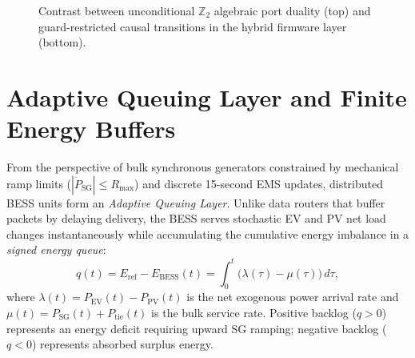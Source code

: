 \documentclass[journal]{IEEEtran}
\begin{document}
\begin{figure}[t]
\centering
{}
\caption{Contrast between unconditional $\mathbb{Z}_2$ algebraic port duality (top) and guard-restricted causal transitions in the hybrid firmware layer (bottom).}
\label{fig:group_causality}
\end{figure}

\section{Adaptive Queuing Layer and Finite Energy Buffers}
From the perspective of bulk synchronous generators constrained by mechanical ramp limits ($|\dot{P}_{\mathrm{SG}}| \le R_{\max}$) and discrete 15-second EMS updates, distributed BESS units form an \emph{Adaptive Queuing Layer}. Unlike data routers that buffer packets by delaying delivery, the BESS serves stochastic EV and PV net load changes instantaneously while accumulating the cumulative energy imbalance in a \emph{signed energy queue}:
\begin{equation}
    q(t) = E_{\mathrm{ref}} - E_{\mathrm{BESS}}(t) = \int_{0}^{t} \big(\lambda(\tau) - \mu(\tau)\big)\,d\tau,
    \label{eq:queue_dyn}
\end{equation}
where $\lambda(t) = P_{\mathrm{EV}}(t) - P_{\mathrm{PV}}(t)$ is the net exogenous power arrival rate and $\mu(t) = P_{\mathrm{SG}}(t) + P_{\mathrm{tie}}(t)$ is the bulk service rate. Positive backlog ($q > 0$) represents an energy deficit requiring upward SG ramping; negative backlog ($q < 0$) represents absorbed surplus energy.
\end{document}
